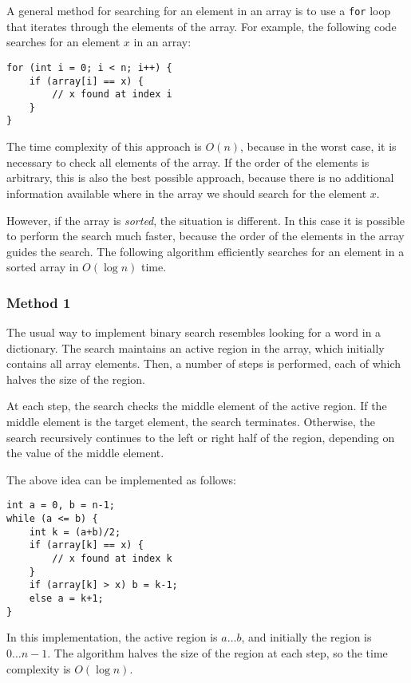 
A general method for searching for an element
in an array is to use a \texttt{for} loop
that iterates through the elements of the array.
For example, the following code searches for
an element $x$ in an array:

\begin{lstlisting}
for (int i = 0; i < n; i++) {
    if (array[i] == x) {
        // x found at index i
    }
}
\end{lstlisting}

The time complexity of this approach is $O(n)$,
because in the worst case, it is necessary to check
all elements of the array.
If the order of the elements is arbitrary,
this is also the best possible approach, because
there is no additional information available where
in the array we should search for the element $x$.

However, if the array is \emph{sorted},
the situation is different.
In this case it is possible to perform the
search much faster, because the order of the
elements in the array guides the search.
The following  algorithm
efficiently searches for an element in a sorted array
in $O(\log n)$ time.

\subsubsection{Method 1}

The usual way to implement binary search
resembles looking for a word in a dictionary.
The search maintains an active region in the array,
which initially contains all array elements.
Then, a number of steps is performed,
each of which halves the size of the region.

At each step, the search checks the middle element
of the active region.
If the middle element is the target element,
the search terminates.
Otherwise, the search recursively continues
to the left or right half of the region,
depending on the value of the middle element.

The above idea can be implemented as follows:
\begin{lstlisting}
int a = 0, b = n-1;
while (a <= b) {
    int k = (a+b)/2;
    if (array[k] == x) {
        // x found at index k
    }
    if (array[k] > x) b = k-1;
    else a = k+1;
}
\end{lstlisting}

In this implementation, the active region is $a \ldots b$,
and initially the region is $0 \ldots n-1$.
The algorithm halves the size of the region at each step,
so the time complexity is $O(\log n)$.

